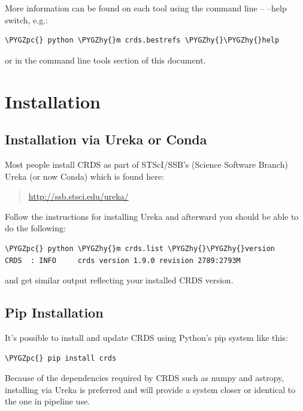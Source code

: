 \documentclass[letterpaper,10pt,english]{sphinxmanual}
\def\PYGZpc{\char`\%}
\def\PYGZhy{\char`\-}
\begin{document}
More information can be found on each tool using the command line -- --help switch,  e.g.:

\begin{Verbatim}[commandchars=\\\{\}]
\PYGZpc{} python \PYGZhy{}m crds.bestrefs \PYGZhy{}\PYGZhy{}help
\end{Verbatim}

or in the command line tools section of this document.


\chapter{Installation}
\label{installation:installation}

\section{Installation via Ureka or Conda}
\label{installation:installation-via-ureka-or-conda}
Most people install CRDS as part of STScI/SSB's (Science Software Branch) Ureka (or now Conda) which is found here:
\begin{quote}

\href{http://ssb.stsci.edu/ureka/}{http://ssb.stsci.edu/ureka/}
\end{quote}

Follow the instructions for installing Ureka and afterward you should be able to do the following:

\begin{Verbatim}[commandchars=\\\{\}]
\PYGZpc{} python \PYGZhy{}m crds.list \PYGZhy{}\PYGZhy{}version
CRDS  : INFO     crds version 1.9.0 revision 2789:2793M
\end{Verbatim}

and get similar output reflecting your installed CRDS version.


\section{Pip Installation}
\label{installation:pip-installation}
It's possible to install and update CRDS using Python's pip system like this:

\begin{Verbatim}[commandchars=\\\{\}]
\PYGZpc{} pip install crds
\end{Verbatim}

Because of the dependencies required by CRDS such as numpy and astropy,  installing via Ureka is preferred
and will provide a system closer or identical to the one in pipeline use.
\end{document}
